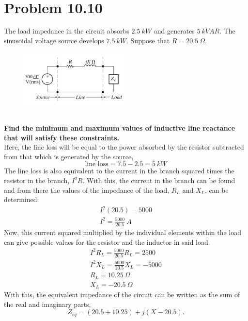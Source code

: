 \documentclass[12pt]{article}
\begin{document}
    \section*{Problem 10.10}
    The load impedance in the circuit absorbs $2.5\ kW$ and generates $5\ kVAR$.
    The sinusoidal voltage source develops $7.5\ kW$. Suppose that $R = 20.5\
    \Omega$. \\
    \begin{figure}[h]
        \centering
        \includegraphics[width=0.5\textwidth]{10.10 Circuit.png}
    \end{figure} \\
    \textbf{Find the minimum and maximum values of inductive line reactance that
    will satisfy these constraints.} \\
    Here, the line loss will be equal to the power absorbed by the resistor
    subtracted from that which is generated by the source,
    \[
        \text{line loss} = 7.5 - 2.5 = 5\ kW
    \]
    The line loss is also equivalent to the current in the branch squared times
    the resistor in the branch, $I^2R$. With this, the current in the branch can
    be found and from there the values of the impedance of the load, $R_{L}$ and
    $X_{L}$, can be determined.
    \begin{gather*}
        I^2 (20.5) = 5000 \\
        I^2 = \frac{5000}{20.5}\ A
    \end{gather*}
    Now, this current squared multiplied by the individual elements within the
    load can give possible values for the resistor and the inductor in said load.
    \begin{gather*}
        I^2 R_{L} = \frac{5000}{20.5} R_{L} = 2500 \\
        I^2 X_{L} = \frac{5000}{20.5} X_{L} = -5000 \\
        R_{L} = 10.25\ \Omega \\
        X_{L} = -20.5\ \Omega
    \end{gather*}
    With this, the equivalent impedance of the circuit can be written as the sum
    of the real and imaginary parts,
    \[
        Z_{eq} = (20.5 + 10. 25) + j (X - 20.5)
    .\]
\end{document}
